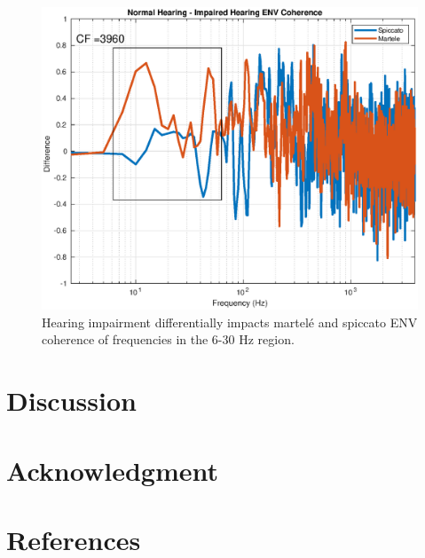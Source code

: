 \documentclass[conference]{IEEEtran}
\begin{document}
\begin{figure}[h]
\includegraphics[width = .5\textwidth]{martele_spiccato_ENV_3960}
\caption{Hearing impairment differentially impacts martel\'{e} and spiccato ENV coherence of frequencies in the 6-30 Hz region.}
\label{mart_env}
\end{figure} 

\section{Discussion}








%


\section*{Acknowledgment}



\section*{References}



% 

{}
\end{document}
